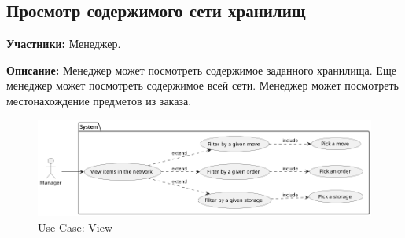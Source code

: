 \subsection{Просмотр содержимого сети хранилищ}

\textbf{Участники:}
Менеджер.

\textbf{Описание:}
Менеджер может посмотреть содержимое заданного хранилища.
Еще менеджер может посмотреть содержимое всей сети.
Менеджер может посмотреть местонахождение предметов из заказа.

\begin{figure}[h]
  \centering
  \includegraphics[width=12cm]{../../out/spec/figure/usecase/view/Storage Net, Use Case, View Content.png}
  \caption{Use Case: View}
\end{figure}